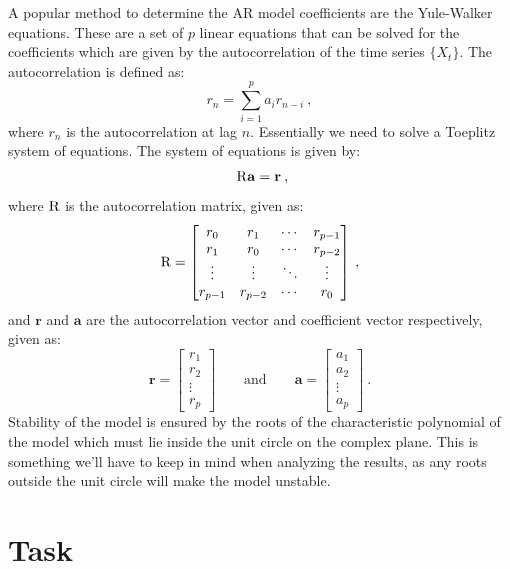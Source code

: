 \documentclass[10pt, titlepage, a4paper]{article}
\newcommand{\bb}[1]{\mathbf#1}
\begin{document}
A popular method to determine the AR model coefficients are the Yule-Walker equations. These are a set of $p$ linear
equations that can be solved for the coefficients which are given by the autocorrelation of the time series 
$\{X_t\}$. The autocorrelation is defined as:
%
\begin{equation}
    r_n = \sum_{i=1}^p a_i r_{n-i}\>,
\end{equation}
%
where $r_n$ is the autocorrelation at lag $n$. Essentially we need to solve a Toeplitz system of equations. The 
system of equations is given by:
%
\begin{equation}~
    \rm{R} \bb{a} = \bb{r}\>,
\end{equation}
%
where $\rm{R}$ is the autocorrelation matrix, given as:
%
\begin{equation}
    \rm{R} = \begin{bmatrix}
        r_0 & r_1 & \cdots & r_{p-1} \\
        r_1 & r_0 & \cdots & r_{p-2} \\
        \vdots & \vdots & \ddots & \vdots \\
        r_{p-1} & r_{p-2} & \cdots & r_0
    \end{bmatrix}\>,
\end{equation}
%
and $\bb{r}$ and $\bb{a}$ are the autocorrelation vector and coefficient vector respectively, given as:
%
\begin{equation}
    \bb{r} = \begin{bmatrix}
        r_1 \\
        r_2 \\
        \vdots \\
        r_p
    \end{bmatrix}\quad\quad\text{and}\quad\quad
    \bb{a} = \begin{bmatrix}
        a_1 \\
        a_2 \\
        \vdots \\
        a_p
    \end{bmatrix}\>.
\end{equation}
%
Stability of the model is ensured by the roots of the characteristic polynomial of the model which must 
lie inside the unit circle on the complex plane. This is something we'll have to keep in mind when analyzing the
results, as any roots outside the unit circle will make the model unstable. \\

\section{Task}
\end{document}
